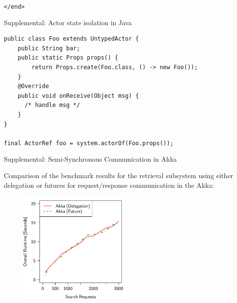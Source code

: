 \documentclass{beamer}
\begin{document}


\begin{frame}{}

\begin{center}
  \texttt{</end>}
\end{center}

\end{frame}


\begin{frame}[fragile]{Supplemental: Actor state isolation in Java}

\begin{verbatim}
public class Foo extends UntypedActor {
    public String bar;
    public static Props props() {
        return Props.create(Foo.class, () -> new Foo());
    }
    @Override
    public void onReceive(Object msg) { 
      /* handle msg */ 
    }
}

final ActorRef foo = system.actorOf(Foo.props());
\end{verbatim}

\end{frame}


\begin{frame}{Supplemental: Semi-Synchronous Communication in Akka}

Comparison of the benchmark results for the retrieval subsystem using either delegation or futures for request/response communication in the Akka:

\begin{center}
  \begin{figure} 
    \includegraphics[width=0.5\textwidth]{graphics/eval-search-comparison-akka-delegation-future.pdf} 
  \end{figure}
\end{center}

\end{frame}

\end{document}
